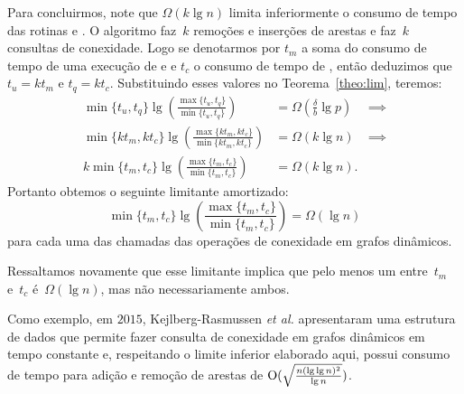 Para concluirmos, note que $\Omega(k\lg n)$ limita inferiormente o consumo de tempo das rotinas \VPSPupdate{} e \VPSPverify{}. O algoritmo \VPSPupdate{} faz~$k$ remoções e inserções de arestas e \VPSPverify{} faz~$k$ consultas de conexidade. Logo se denotarmos por $t_m$ a soma do consumo de tempo de uma execução de \dymGraphAddEdge{} e \dymGraphDelEdge{} e $t_c$ o consumo de tempo de \dymGraphQuery{}, então deduzimos que $t_u = k t_m$ e $t_q = k t_c$. Substituindo esses valores no Teorema~\ref{theo:lim}, teremos:
\begin{align*}
\min\{t_u,t_q\}\lg \left( \frac{\max\{t_u,t_q\}}{\min\{t_u,t_q\}}\right) &= \Omega\left(\frac{\delta}{b}\lg p\right)&\implies\\
\min\{k t_m,k t_c\}\lg \left( \frac{\max\{k t_m,k t_c\}}{\min\{k t_m,k t_c\}}\right) &= \Omega(k \lg n)&\implies\\
k\min\{ t_m, t_c\}\lg \left( \frac{\max\{ t_m, t_c\}}{\min\{ t_m,t_c\}}\right) &= \Omega(k \lg n).
\end{align*}
Portanto obtemos o seguinte limitante amortizado: 
$$
\min\{ t_m, t_c\}\lg \left( \frac{\max\{ t_m, t_c\}}{\min\{ t_m,t_c\}}\right) = \Omega(\lg n)
$$
para cada uma das chamadas das operações de conexidade em grafos dinâmicos.

Ressaltamos novamente que esse limitante implica que pelo menos um entre~$t_m$ e~$t_c$ é~$\Omega(\lg n)$, mas não necessariamente ambos.


Como exemplo, em $2015$, Kejlberg-Rasmussen \textit{et al. }\cite{kejlbergrasmussen_et_al} apresentaram uma estrutura de dados que permite fazer consulta de conexidade em grafos dinâmicos em tempo constante e, respeitando o limite inferior elaborado aqui, possui consumo de tempo para adição e remoção de arestas de $\mathrm{O}(\sqrt{\frac{n(\lg \lg n)^2}{\lg n}})$.



